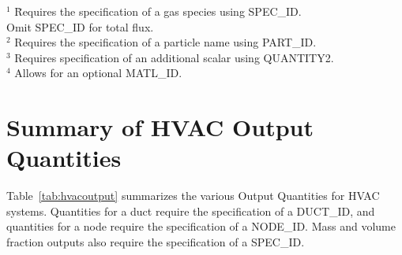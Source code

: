 \documentclass[11pt]{book}
\begin{document}
\noindent
\begin{tabbing}
$^1$ \hspace{0.05in} \= Requires the specification of a gas species using {\ct SPEC\_ID}. \\
                     \> Omit {\ct SPEC\_ID} for total flux. \\
$^2$                 \> Requires the specification of a particle name using {\ct PART\_ID}. \\
$^3$                 \> Requires specification of an additional scalar using {\ct QUANTITY2}. \\
$^4$                 \> Allows for an optional {\ct MATL\_ID}.
\end{tabbing}


\clearpage

\section{Summary of HVAC Output Quantities}
\label{info:hvacoutputquantities}

Table~\ref{tab:hvacoutput} summarizes the various Output Quantities for HVAC systems.  Quantities for a duct require the specification
of a {\ct DUCT\_ID}, and quantities for a node require the specification of a {\ct NODE\_ID}.  Mass and volume fraction outputs also require the specification of a {\ct SPEC\_ID}.
\end{document}
